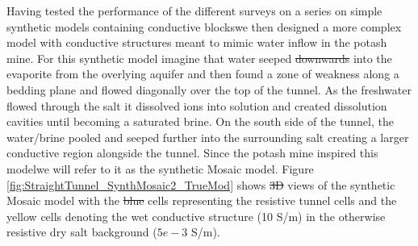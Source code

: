 \documentclass[preprint,authoryear,12pt]{elsarticle}
\providecommand{\DIFaddtex}[1]{{\protect\color{blue}\uwave{#1}}} %
\providecommand{\DIFdeltex}[1]{{\protect\color{red}\sout{#1}}}                      %
\providecommand{\DIFaddbegin}{} %
\providecommand{\DIFaddend}{} %
\providecommand{\DIFdelbegin}{} %
\providecommand{\DIFdelend}{} %
\providecommand{\DIFadd}[1]{\texorpdfstring{\DIFaddtex{#1}}{#1}} %
\providecommand{\DIFdel}[1]{\texorpdfstring{\DIFdeltex{#1}}{}} %
\begin{document}
\DIFdelend Having tested the performance of the different surveys on a series on simple synthetic models containing conductive blocks\DIFaddbegin \DIFadd{, }\DIFaddend we then designed a more complex model with conductive structures meant to mimic water inflow in the potash mine. For this synthetic model imagine that water seeped \DIFdelbegin \DIFdel{downwards }\DIFdelend \DIFaddbegin \DIFadd{downward }\DIFaddend into the evaporite from the overlying aquifer and then found a zone of weakness along a bedding plane and flowed diagonally over the top of the tunnel. As the freshwater flowed through the salt it dissolved ions into solution and created dissolution cavities until becoming a saturated brine. On the south side of the tunnel, the water/brine pooled and seeped further into the surrounding salt creating a larger conductive region alongside the tunnel. Since the potash mine inspired this model\DIFaddbegin \DIFadd{, }\DIFaddend we will refer to it as the synthetic Mosaic model.  Figure \ref{fig:StraightTunnel_SynthMosaic2_TrueMod} shows \DIFdelbegin \DIFdel{3D }\DIFdelend \DIFaddbegin \DIFadd{3-D }\DIFaddend views of the synthetic Mosaic model with the \DIFdelbegin \DIFdel{blue }\DIFdelend \DIFaddbegin \DIFadd{dark purple }\DIFaddend cells representing the resistive tunnel cells and the yellow cells denoting the wet conductive structure (10 S/m) in the otherwise resistive dry salt background (\DIFdelbegin \DIFdel{$5e-3$ }\DIFdelend \DIFaddbegin \DIFadd{$5 \times 10^{\text{-3}}$ }\DIFaddend S/m).
\end{document}
